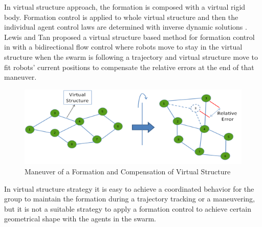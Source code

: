 In virtual structure approach, the formation is composed with a virtual rigid body. Formation control is applied to whole virtual structure and then the individual agent control laws are determined with inverse dynamic solutions \cite{12}.  Lewis and Tan proposed a virtual structure based method for formation control in \cite{23} with a bidirectional flow control where robots move to stay in the virtual structure when the swarm is following a trajectory and virtual structure move to fit robots' current positions to compensate the relative errors at the end of that maneuver. 

\begin{figure}[H]
	\caption{Maneuver of a Formation and Compensation of Virtual Structure}
	\centering
	\includegraphics[scale = 0.95]{virtual_structure}
\end{figure}

In virtual structure strategy it is easy to achieve a coordinated behavior for the group to maintain the formation during a trajectory tracking or a maneuvering, but it is not a suitable strategy to apply a formation control to achieve certain geometrical shape with the agents in the swarm. 


